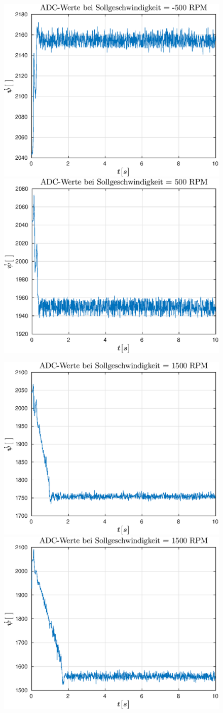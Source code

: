 \begin{figure}[h]
	\includegraphics[width=0.5\linewidth]{img/psi1__d___rpm_-500.eps}
	\includegraphics[width=0.5\linewidth]{img/psi1__d___rpm_500.eps}
\end{figure}

\newpage
\begin{figure}[h]
	\includegraphics[width=0.5\linewidth]{img/psi1__d___rpm_1500.eps}
	\includegraphics[width=0.5\linewidth]{img/psi1__d___rpm_2500.eps}
\end{figure}

